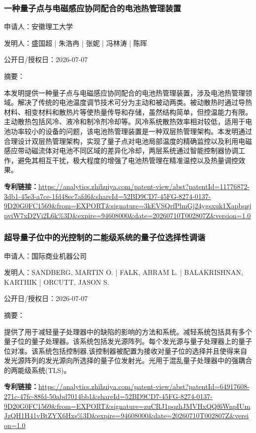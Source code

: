 \documentclass[12pt,a4paper]{ctexart}
\begin{document}
\subsubsection{ 一种量子点与电磁感应协同配合的电池热管理装置 }

申请人：安徽理工大学

发明人：盛国超 | 朱浩冉 | 张妮 | 冯林涛 | 陈晖

公开日/授权日：2026-07-07

摘要：

本发明提供一种量子点与电磁感应协同配合的电池热管理装置，涉及电池热管理领域。解决了传统的电池温度调节技术可分为主动和被动两类。被动散热时通过导热材料、相变材料和散热片等使热量传导和存储，虽然结构简单，但控温能力有限。主动散热包括风冷、液冷和制冷剂冷却等。风冷系统散热效率相对较低，适用于电池功率较小的设备的问题，该电池热管理装置是一种双层热管理架构。本发明通过合理设计双层热管理架构，实现了量子点对电池局部温度的精确监控以及利用电磁感应带动磁流体对电池不同区域的差异化冷却，两层系统通过智能控制器协调工作，避免其相互干扰，极大程度的增强了电池热管理在精准温控以及热量调控效果。

\noindent\textbf{专利链接：}\url{https://analytics.zhihuiya.com/patent-view/abst?patentId=11776872-3db1-45e3-a7ce-1fd48ec7afd6&shareId=52BD9CD7-45FG-8274-0137-9D20G0FC1569&from=EXPORT&signature=3kEVSQrfPlmGj24ygsxuk1XapbqzjpviW7xD2Vi2L6k%3D&expire=94608000&date=20260710T002807Z&version=1.0}

\subsubsection{ 超导量子位中的光控制的二能级系统的量子位选择性调谐 }

申请人：国际商业机器公司

发明人：SANDBERG, MARTIN O. | FALK, ABRAM L. | BALAKRISHNAN, KARTHIK | ORCUTT, JASON S.

公开日/授权日：2026-07-07

摘要：

提供了用于减轻量子处理器中的缺陷的影响的方法和系统。减轻系统包括具有多个量子位的量子处理器。该系统包括发光源阵列。每个发光源与量子处理器上的量子位对准。该系统包括控制器,该控制器被配置为接收对量子位的选择并且使得来自发光源阵列的发光源向所选择的量子位发射光。光用于混乱量子处理器中的强耦合的两能级系统(TLS)。

\noindent\textbf{专利链接：}\url{https://analytics.zhihuiya.com/patent-view/abst?patentId=64917608-271c-47fc-88fd-50abd7014bb1&shareId=52BD9CD7-45FG-8274-0137-9D20G0FC1569&from=EXPORT&signature=zuCRJ1pqzhJMVHxQQf6WnpIUmJzQH1H41vBtZYX6Hxs%3D&expire=94608000&date=20260710T002807Z&version=1.0}
\end{document}

